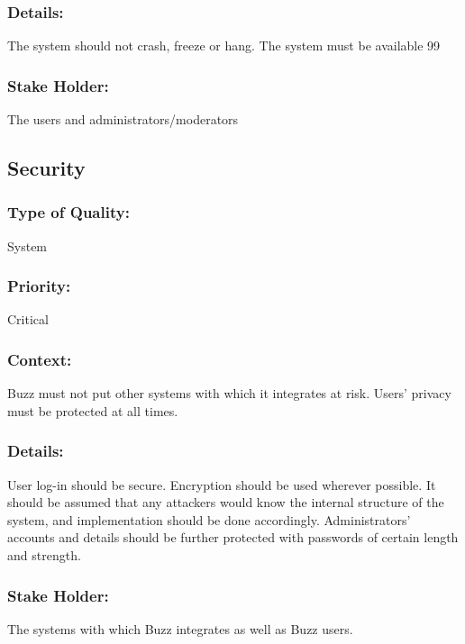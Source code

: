 \documentclass[11pt]{article}
\begin{document}
		\subsubsection{Details:}
			\textbf{}The system should not crash, freeze or hang. The system must be available 99%
		
		\subsubsection{Stake Holder:}
			\textbf{}The users and administrators/moderators

	\subsection{Security}
		\subsubsection{Type of Quality:}
			\textbf{}System
		
		\subsubsection{Priority:}
			\textbf{}Critical

		\subsubsection{Context:}
			\textbf{}Buzz must not put other systems with which it integrates at risk. Users’ privacy must be protected at all times. 
		
		\subsubsection{Details:}
			\textbf{}User log-in should be secure. Encryption should be used wherever possible. It should be assumed that any attackers would know the internal structure of the system, and implementation should be done accordingly. Administrators’ accounts and details should be further protected with passwords of certain length and strength.
		
		\subsubsection{Stake Holder:}
			\textbf{}The systems with which Buzz integrates as well as Buzz users.
\end{document}
